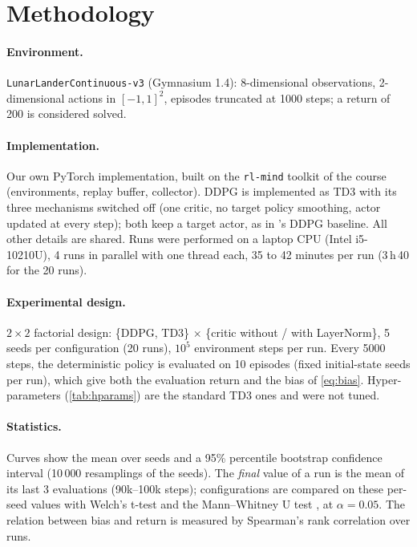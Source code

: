 \documentclass[10pt,a4paper]{article}
\begin{document}
\section{Methodology}
\label{sec:method}
\paragraph{Environment.} \texttt{LunarLanderContinuous-v3} (Gymnasium 1.4): 8-dimensional observations, 2-dimensional actions in $[-1,1]^2$, episodes truncated at 1000 steps; a return of 200 is considered solved.

\paragraph{Implementation.} Our own PyTorch implementation, built on the \texttt{rl-mind} toolkit of the course (environments, replay buffer, collector). DDPG is implemented as TD3 with its three mechanisms switched off (one critic, no target policy smoothing, actor updated at every step); both keep a target actor, as in \citet{fujimoto2018td3}'s DDPG baseline. All other details are shared. Runs were performed on a laptop CPU (Intel i5-10210U), 4 runs in parallel with one thread each, 35 to 42 minutes per run (3\,h\,40 for the 20 runs).

\paragraph{Experimental design.} $2\times 2$ factorial design: \{DDPG, TD3\} $\times$ \{critic without / with LayerNorm\}, 5 seeds per configuration (20 runs), $10^5$ environment steps per run. Every 5000 steps, the deterministic policy is evaluated on 10 episodes (fixed initial-state seeds per run), which give both the evaluation return and the bias of \cref{eq:bias}. Hyper-parameters (\cref{tab:hparams}) are the standard TD3 ones and were not tuned.

\paragraph{Statistics.} Curves show the mean over seeds and a 95\% percentile bootstrap confidence interval (10\,000 resamplings of the seeds). The \emph{final} value of a run is the mean of its last 3 evaluations (90k--100k steps); configurations are compared on these per-seed values with Welch's t-test and the Mann--Whitney U test \citep{colas2019hitchhiker}, at $\alpha = 0.05$. The relation between bias and return is measured by Spearman's rank correlation over runs.
\end{document}
